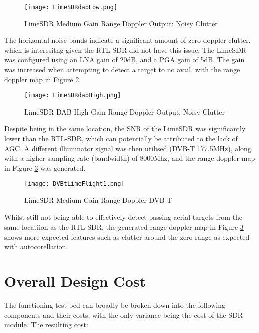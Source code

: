 \begin{figure}[h!]
    \centering
    \texttt{[image: LimeSDRdabLow.png]}
    \caption{LimeSDR Medium Gain Range Doppler Output: Noisy Clutter}
    \label{fig:RDM2}
\end{figure}

The horizontal noise bands indicate a significant amount of zero doppler clutter, which is interesitng given the RTL-SDR did not have this issue. The LimeSDR was configured using an LNA gain of 20dB, and a PGA gain of 5dB. The gain was increased when attempting to detect a target to no avail, with the range doppler map in Figure \ref{fig:RDMLimeHighGain}. 

\begin{figure}[h!]
    \centering
    \texttt{[image: LimeSDRdabHigh.png]}
    \caption{LimeSDR DAB High Gain Range Doppler Output: Noisy Clutter}
    \label{fig:RDMLimeHighGain}
\end{figure}

Despite being in the same location, the SNR of the LimeSDR was significantly lower than the RTL-SDR, which can potentially be attributed to the lack of AGC. A different illuminator signal was then utilised (DVB-T 177.5MHz), along with a higher sampling rate (bandwidth) of 8000Mhz, and the range doppler map in Figure \ref{fig:RDMLimeDVB} was generated.

\begin{figure}[h!]
    \centering
    \texttt{[image: DVBtLimeFlight1.png]}
    \caption{LimeSDR Medium Gain Range Doppler DVB-T}
    \label{fig:RDMLimeDVB}
\end{figure}

Whilst still not being able to effectively detect passing aerial targets from the same locatiion as the RTL-SDR, the generated range doppler map in Figure \ref{fig:RDMLimeDVB} shows more expected features such as clutter around the zero range as expected with autocorellation. 


\section{Overall Design Cost}
The functioning test bed can broadly be broken down into the following components and their costs, with the only variance being the cost of the SDR module. The resulting cost: 

